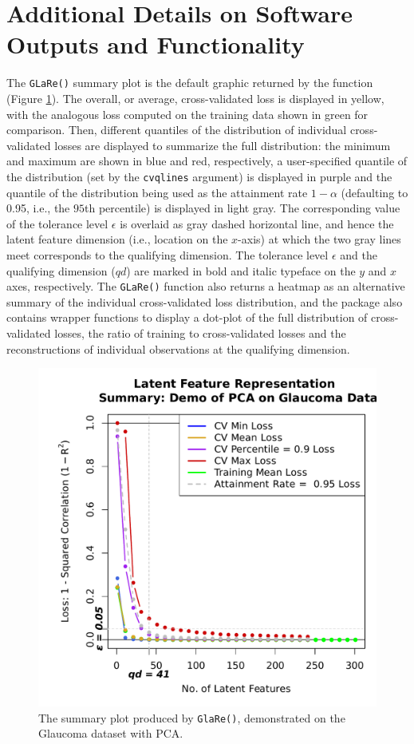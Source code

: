 \section{Additional Details on Software Outputs and Functionality}\label{sec:additional-outputs}

The \texttt{GLaRe()} summary plot is the default graphic returned by the  function (Figure \ref{fig:glare-anatomy-plot}).
The overall, or average, cross-validated loss is displayed in yellow, with the analogous loss computed on the training data shown in green for comparison.
Then, different quantiles of the distribution of individual cross-validated losses are displayed to summarize the full distribution: the minimum and maximum are shown in blue and red, respectively, a user-specified quantile of the distribution (set by the \texttt{cvqlines} argument) is displayed in purple and the quantile of the distribution being used as the attainment rate $1 - \alpha$ (defaulting to 0.95, i.e., the $95$th percentile) is displayed in light gray.
The corresponding value of the tolerance level $\epsilon$ is overlaid as gray dashed horizontal line, and hence the latent feature dimension (i.e., location on the $x$-axis) at which the two gray lines meet corresponds to the qualifying dimension.
The tolerance level $\epsilon$ and the qualifying dimension ($qd$) are marked in bold and italic typeface on the $y$ and $x$ axes, respectively.
The \texttt{GLaRe()} function also returns a heatmap as an alternative summary of the individual cross-validated loss distribution, and the package also contains wrapper functions to display a dot-plot of the full distribution of cross-validated losses, the ratio of training to cross-validated losses and the reconstructions of individual observations at the qualifying dimension. 

\begin{figure}
    \centering
    \includegraphics[width=0.5\linewidth]{figures/glare-anatomy-plot.pdf}
    \caption{The summary plot produced by \texttt{GlaRe()}, demonstrated on the Glaucoma dataset with PCA.}
    \label{fig:glare-anatomy-plot}
\end{figure}


